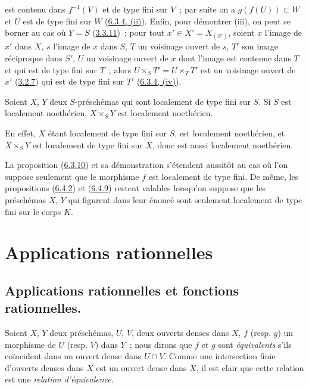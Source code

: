 est contenu dans $f^{-1}(V)$ et de type fini sur $V$~; par suite on a
$g(f(U))\subset W$ et $U$ est de type fini sur $W$
(\hyperref[I.6.3.4-fr]{6.3.4, (ii)}). Enfin, pour démontrer (iii), on peut se
borner au cas où $Y=S$ (\hyperref[I.3.3.11-fr]{3.3.11})~; pour tout
$x'\in X'=X_{(S')}$, soient $x$ l'image de $x'$ dans $X$, $s$ l'image de $x$
dans $S$, $T$ un voisinage ouvert de $s$, $T'$ son image réciproque dans $S'$,
$U$ un voisinage ouvert de $x$ dont l'image est contenue dans $T$ et qui est de
type fini sur $T$~; alors $U\times_S T'=U\times_T T'$ est un voisinage ouvert
de $x'$ (\hyperref[I.3.2.7-fr]{3.2.7}) qui est de type fini sur $T'$
(\hyperref[I.6.3.4-fr]{6.3.4, (iv)}).

\begin{corollary}[6.6.7]
\label{I.6.6.7-fr}
Soient $X$, $Y$ deux $S$-préschémas qui sont localement de type fini sur $S$.
Si $S$ est localement noethérien, $X\times_S Y$ est localement noethérien.
\end{corollary}

En effet, $X$ étant localement de type fini sur $S$, est localement
noethérien, et $X\times_S Y$ est localement de type fini sur $X$, donc est
aussi localement noethérien.

\begin{remark}[6.6.8]
\label{I.6.6.8-fr}
La proposition (\hyperref[I.6.3.10-fr]{6.3.10}) et sa démonstration s'étendent
aussitôt au cas où l'on suppose seulement que le morphisme $f$ est localement
de type fini. De même, les propositions
(\hyperref[I.6.4.2-fr]{6.4.2}) et (\hyperref[I.6.4.9-fr]{6.4.9}) restent
valables lorsqu'on suppose que les préschémas $X$, $Y$ qui figurent dans leur
énoncé sont seulement localement de type fini sur le corps $K$.
\end{remark}

\section{Applications rationnelles}
\label{section:I.7-fr}

\subsection{Applications rationnelles et fonctions rationnelles.}
\label{subsection:I.7.1-fr}

\begin{env}[7.1.1]
\label{I.7.1.1-fr}
Soient $X$, $Y$ deux préschémas, $U$, $V$, deux ouverts denses dans $X$, $f$
(resp. $g$) un morphisme de $U$ (resp. $V$) dans $Y$~; nous dirons que $f$ et
$g$ sont
\emph{équivalents} s'ils coïncident dans un ouvert dense dans $U\cap V$.
Comme une intersection finie d'ouverts denses dans $X$ est un ouvert dense
dans $X$, il est clair que cette relation est une
\emph{relation d'équivalence}.
\end{env}

